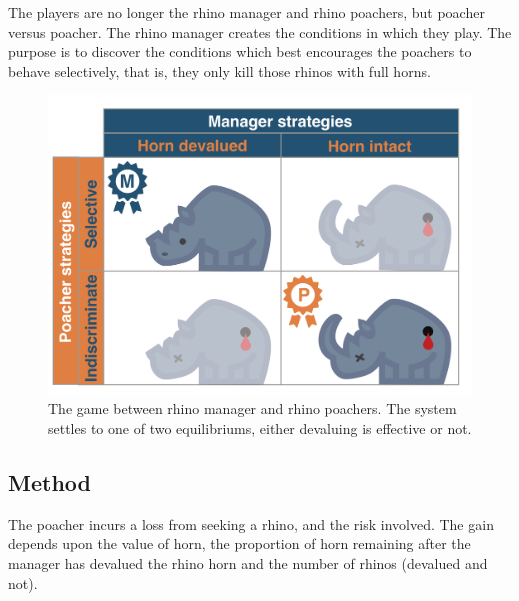 \documentclass[10pt]{article}
\begin{document}
The players are no longer the rhino manager and rhino poachers, but poacher versus poacher. The rhino manager creates the conditions in which they play. The purpose is to discover the conditions which best encourages the poachers to behave selectively, that is, they only kill those rhinos with full horns. 
\begin{figure}
\centering
\includegraphics[scale=0.2]{RhinoPic.pdf}
\caption{\label{fig:RhinoPic} The game between rhino manager and rhino poachers. The system settles to one of two equilibriums, either devaluing is effective or not. }
\end{figure}
\subsection{Method}

The poacher incurs a loss from seeking a rhino, and the risk involved. The gain depends upon the value of horn, the proportion of horn remaining after the manager has devalued the rhino horn and the number of rhinos (devalued and not). 
\end{document}
